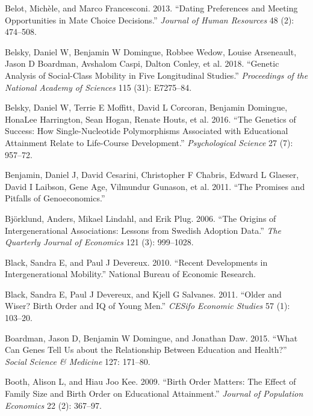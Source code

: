 \documentclass[
]{article}
\newlength{\cslhangindent}
\newlength{\cslentryspacingunit} %
\newenvironment{CSLReferences}[2] %
 {%
  \setlength{\parindent}{0pt}
  \ifodd #1
  \let\oldpar\par
  \def\par{\hangindent=\cslhangindent\oldpar}
  \fi
  \setlength{\parskip}{#2\cslentryspacingunit}
 }%
 {}
\theoremstyle{definition}
\theoremstyle{definition}
\theoremstyle{definition}
\theoremstyle{definition}
\theoremstyle{remark}
\begin{document}
\begin{CSLReferences}{1}{0}
\leavevmode{}%
Belot, Michèle, and Marco Francesconi. 2013. {``Dating Preferences and Meeting Opportunities in Mate Choice Decisions.''} \emph{Journal of Human Resources} 48 (2): 474--508.

\leavevmode{}%
Belsky, Daniel W, Benjamin W Domingue, Robbee Wedow, Louise Arseneault, Jason D Boardman, Avshalom Caspi, Dalton Conley, et al. 2018. {``Genetic Analysis of Social-Class Mobility in Five Longitudinal Studies.''} \emph{Proceedings of the National Academy of Sciences} 115 (31): E7275--84.

\leavevmode{}%
Belsky, Daniel W, Terrie E Moffitt, David L Corcoran, Benjamin Domingue, HonaLee Harrington, Sean Hogan, Renate Houts, et al. 2016. {``The Genetics of Success: How Single-Nucleotide Polymorphisms Associated with Educational Attainment Relate to Life-Course Development.''} \emph{Psychological Science} 27 (7): 957--72.

\leavevmode{}%
Benjamin, Daniel J, David Cesarini, Christopher F Chabris, Edward L Glaeser, David I Laibson, Gene Age, Vilmundur Gunason, et al. 2011. {``The Promises and Pitfalls of Genoeconomics.''}

\leavevmode{}%
Björklund, Anders, Mikael Lindahl, and Erik Plug. 2006. {``The Origins of Intergenerational Associations: Lessons from Swedish Adoption Data.''} \emph{The Quarterly Journal of Economics} 121 (3): 999--1028.

\leavevmode{}%
Black, Sandra E, and Paul J Devereux. 2010. {``Recent Developments in Intergenerational Mobility.''} National Bureau of Economic Research.

\leavevmode{}%
Black, Sandra E, Paul J Devereux, and Kjell G Salvanes. 2011. {``Older and Wiser? Birth Order and IQ of Young Men.''} \emph{CESifo Economic Studies} 57 (1): 103--20.

\leavevmode{}%
Boardman, Jason D, Benjamin W Domingue, and Jonathan Daw. 2015. {``What Can Genes Tell Us about the Relationship Between Education and Health?''} \emph{Social Science \& Medicine} 127: 171--80.

\leavevmode{}%
Booth, Alison L, and Hiau Joo Kee. 2009. {``Birth Order Matters: The Effect of Family Size and Birth Order on Educational Attainment.''} \emph{Journal of Population Economics} 22 (2): 367--97.


\end{CSLReferences}
\end{document}
